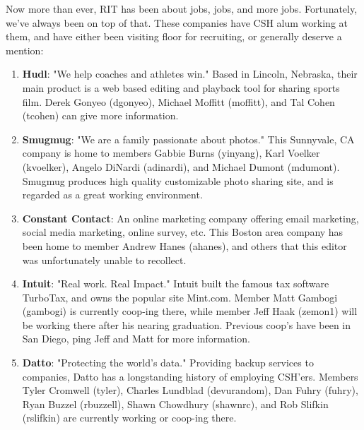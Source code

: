 \documentclass[9pt]{extarticle} %
\begin{document}
\begin{minipage}[t]{.66\linewidth} %
\vspace{-0.4cm}
\hypertarget{firstnews}{}

Now more than ever, RIT has been about jobs, jobs, and more jobs. Fortunately, we've always been on top of that. These companies have CSH alum working at them, and have either been visiting floor for recruiting, or generally deserve a mention:

\begin{enumerate}
\item{\textbf{Hudl}: "We help coaches and athletes win." Based in Lincoln, Nebraska, their main product is a web based editing and playback tool for sharing sports film. Derek Gonyeo (dgonyeo), Michael Moffitt (moffitt), and Tal Cohen (tcohen) can give more information.}
\item{\textbf{Smugmug}: "We are a family passionate about photos." This Sunnyvale, CA company is home to members Gabbie Burns (yinyang), Karl Voelker (kvoelker), Angelo DiNardi (adinardi), and Michael Dumont (mdumont). Smugmug produces high quality customizable photo sharing site, and is regarded as a great working environment.}
\item{\textbf{Constant Contact}: An online marketing company offering email marketing, social media marketing, online survey, etc. This Boston area company has been home to member Andrew Hanes (ahanes), and others that this editor was unfortunately unable to recollect.}
\item{\textbf{Intuit}: "Real work. Real Impact." Intuit built the famous tax software TurboTax, and owns the popular site Mint.com. Member Matt Gambogi (gambogi) is currently coop-ing there, while member Jeff Haak (zemon1) will be working there after his nearing graduation. Previous coop's have been in San Diego, ping Jeff and Matt for more information.}
\item{\textbf{Datto}: "Protecting the world's data." Providing backup services to companies, Datto has a longstanding history of employing CSH'ers. Members Tyler Cromwell (tyler), Charles Lundblad (devurandom), Dan Fuhry (fuhry), Ryan Buzzel (rbuzzell), Shawn Chowdhury (shawnrc), and Rob Slifkin (rslifkin) are currently working or coop-ing there.}
\end{enumerate}


\hypertarget{secondnews}{} 


\end{minipage}
\end{document}
